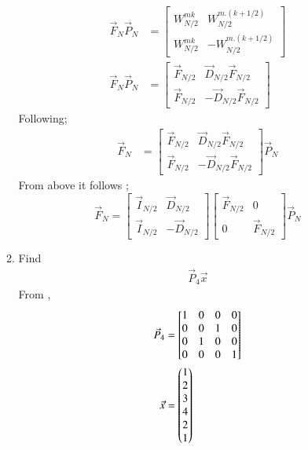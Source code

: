 \documentclass[journal,12pt,twocolumn]{IEEEtran}
\renewcommand\thesection{\arabic{section}}
\begin{document}
\begin{enumerate}[label=\thesection.\arabic*]
\begin{enumerate}[label=\arabic*.,ref=\thesection.\theenumi]
    
   \begin{align}
     \vec{F}_{N}\vec{P}_{N}&=\begin{bmatrix}
       {W_{N/2}^{mk}}&{W_{N/2}^{m.(k+1/2)}}\\ {W_{N/2}^{mk}}&-{W_{N/2}^{m.(k+1/2)}}
     \end{bmatrix} 	\\
     \vec{F}_{N}\vec{P}_{N}&=\begin{bmatrix}
       \vec{F}_{N/2}&\vec{D}_{N/2}\vec{F}_{N/2}\\ \vec{F}_{N/2}&-\vec{D}_{N/2}\vec{F}_{N/2}
     \end{bmatrix}    	
   \end{align}
   Following;
   \begin{align}
     \vec{F}_{N}&=\begin{bmatrix}
       \vec{F}_{N/2}&\vec{D}_{N/2}\vec{F}_{N/2}\\ \vec{F}_{N/2}&-\vec{D}_{N/2}\vec{F}_{N/2}
     \end{bmatrix} \vec{P}_{N}   	
   \end{align}
   From above it follows ;
   \begin{equation}
     \vec{F}_{N}=
     \begin{bmatrix}
       \vec{I}_{N/2} & \vec{D}_{N/2} \\
       \vec{I}_{N/2} & -\vec{D}_{N/2}
     \end{bmatrix}
     \begin{bmatrix}
       \vec{F}_{N/2} & 0 \\
       0 & \vec{F}_{N/2}
     \end{bmatrix}
     \vec{P}_{N}
   \end{equation}
     \item Find 
     \begin{align}
       \vec{P}_4 \vec{x}
     \end{align}
   \solution
      From ,
      \begin{align}
        \vec{P}_4&=\begin{bmatrix}
          1&0&0&0\\0&0&1&0\\0&1&0&0\\0&0&0&1
        \end{bmatrix}\\
        \vec{x}&=\myvec{1\\2\\3\\4\\2\\1}

\end{align}
\end{enumerate}
\end{enumerate}
\end{document}
